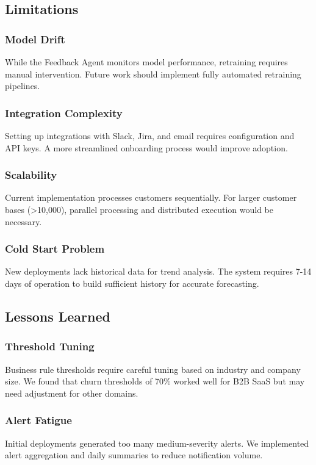 \documentclass[conference]{IEEEtran}
\begin{document}
\subsection{Limitations}

\subsubsection{Model Drift}
While the Feedback Agent monitors model performance, retraining requires manual intervention. Future work should implement fully automated retraining pipelines.

\subsubsection{Integration Complexity}
Setting up integrations with Slack, Jira, and email requires configuration and API keys. A more streamlined onboarding process would improve adoption.

\subsubsection{Scalability}
Current implementation processes customers sequentially. For larger customer bases (>10,000), parallel processing and distributed execution would be necessary.

\subsubsection{Cold Start Problem}
New deployments lack historical data for trend analysis. The system requires 7-14 days of operation to build sufficient history for accurate forecasting.

\subsection{Lessons Learned}

\subsubsection{Threshold Tuning}
Business rule thresholds require careful tuning based on industry and company size. We found that churn thresholds of 70\% worked well for B2B SaaS but may need adjustment for other domains.

\subsubsection{Alert Fatigue}
Initial deployments generated too many medium-severity alerts. We implemented alert aggregation and daily summaries to reduce notification volume.
\end{document}
